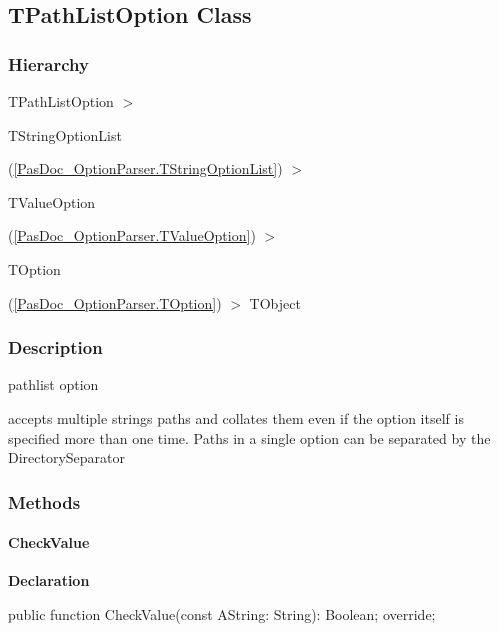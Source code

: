 \documentclass{report}
\newif\ifpdf
\begin{document}
\subsection*{TPathListOption Class}
\fi
\label{PasDoc_OptionParser.TPathListOption}
\subsubsection*{\large{\textbf{Hierarchy}}\normalsize\hspace{1ex}\hfill}
TPathListOption {$>$} \begin{ttfamily}TStringOptionList\end{ttfamily}(\ref{PasDoc_OptionParser.TStringOptionList}) {$>$} \begin{ttfamily}TValueOption\end{ttfamily}(\ref{PasDoc_OptionParser.TValueOption}) {$>$} \begin{ttfamily}TOption\end{ttfamily}(\ref{PasDoc_OptionParser.TOption}) {$>$} 
TObject
\subsubsection*{\large{\textbf{Description}}\normalsize\hspace{1ex}\hfill}
pathlist option\hfill\vspace*{1ex}

 accepts multiple strings paths and collates them even if the option itself is specified more than one time. Paths in a single option can be separated by the DirectorySeparator\subsubsection*{\large{\textbf{Methods}}\normalsize\hspace{1ex}\hfill}
\paragraph*{CheckValue}\hspace*{\fill}

\label{PasDoc_OptionParser.TPathListOption-CheckValue}
\begin{list}{}{
\setlength{\itemindent}{0cm}
\setlength{\listparindent}{0cm}
\setlength{\leftmargin}{\evensidemargin}
\addtolength{\leftmargin}{\tmplength}
\settowidth{\labelsep}{X}
\addtolength{\leftmargin}{\labelsep}
\setlength{\labelwidth}{\tmplength}
}
\item[\textbf{Declaration}\hfill]
\ifpdf
\begin{flushleft}
\fi
\begin{ttfamily}
public function CheckValue(const AString: String): Boolean; override;\end{ttfamily}

\ifpdf
\end{flushleft}
\fi

\end{list}
\ifpdf
\end{document}
